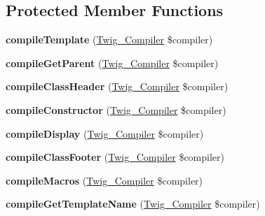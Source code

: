 \subsection*{Protected Member Functions}
\begin{DoxyCompactItemize}
\item 
{\bfseries compile\+Template} (\hyperlink{classTwig__Compiler}{Twig\+\_\+\+Compiler} \$compiler)\hypertarget{classTwig__Node__Module_ab8750dd0d7f4622a92de4012ea351d4d}{}\label{classTwig__Node__Module_ab8750dd0d7f4622a92de4012ea351d4d}

\item 
{\bfseries compile\+Get\+Parent} (\hyperlink{classTwig__Compiler}{Twig\+\_\+\+Compiler} \$compiler)\hypertarget{classTwig__Node__Module_a026ffdacc927d81ba3019247570728e9}{}\label{classTwig__Node__Module_a026ffdacc927d81ba3019247570728e9}

\item 
{\bfseries compile\+Class\+Header} (\hyperlink{classTwig__Compiler}{Twig\+\_\+\+Compiler} \$compiler)\hypertarget{classTwig__Node__Module_a0d660ce2d3baa36dfccc3547fa86b139}{}\label{classTwig__Node__Module_a0d660ce2d3baa36dfccc3547fa86b139}

\item 
{\bfseries compile\+Constructor} (\hyperlink{classTwig__Compiler}{Twig\+\_\+\+Compiler} \$compiler)\hypertarget{classTwig__Node__Module_abed5bc9750026b92b5e7f3a5d0014244}{}\label{classTwig__Node__Module_abed5bc9750026b92b5e7f3a5d0014244}

\item 
{\bfseries compile\+Display} (\hyperlink{classTwig__Compiler}{Twig\+\_\+\+Compiler} \$compiler)\hypertarget{classTwig__Node__Module_a0d86ce07b7592f86935523c208a677ac}{}\label{classTwig__Node__Module_a0d86ce07b7592f86935523c208a677ac}

\item 
{\bfseries compile\+Class\+Footer} (\hyperlink{classTwig__Compiler}{Twig\+\_\+\+Compiler} \$compiler)\hypertarget{classTwig__Node__Module_aebb1c8c7dae16c2429d1a29c24b0b13f}{}\label{classTwig__Node__Module_aebb1c8c7dae16c2429d1a29c24b0b13f}

\item 
{\bfseries compile\+Macros} (\hyperlink{classTwig__Compiler}{Twig\+\_\+\+Compiler} \$compiler)\hypertarget{classTwig__Node__Module_a73340894c6fd3f909627691e5e88ec41}{}\label{classTwig__Node__Module_a73340894c6fd3f909627691e5e88ec41}

\item 
{\bfseries compile\+Get\+Template\+Name} (\hyperlink{classTwig__Compiler}{Twig\+\_\+\+Compiler} \$compiler)\hypertarget{classTwig__Node__Module_a3815ad5d67fffe17420fc2230e246e4f}{}\label{classTwig__Node__Module_a3815ad5d67fffe17420fc2230e246e4f}


\end{DoxyCompactItemize}
